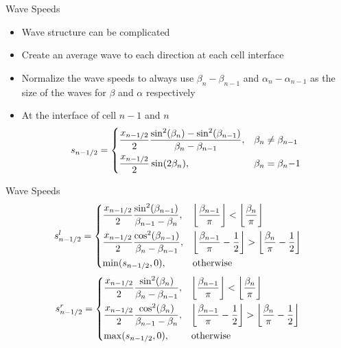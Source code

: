\documentclass[12pt]{beamer}
\begin{document}
\begin{frame}{Wave Speeds}
    \begin{itemize}
        \item Wave structure can be complicated
        \item Create an average wave to each direction at each cell interface
        \item Normalize the wave speeds to always use $\beta_n - \beta_{n-1}$ and
            $\alpha_n - \alpha_{n-1}$ as the size of the waves for $\beta$ and $\alpha$
            respectively
        \item At the interface of cell $n-1$ and $n$
            \[ s_{n-1/2} = \begin{dcases}
                \frac{x_{n-1/2}}{2} \frac{\sin^2(\beta_n) - \sin^2(\beta_{n-1})}{\beta_n
                - \beta_{n-1}}, & \beta_n \ne \beta_{n-1} \\
                \frac{x_{n-1/2}}{2} \sin(2\beta_n), & \beta_n = \beta_n{-1}
            \end{dcases} \]
    \end{itemize}
\end{frame}

\begin{frame}{Wave Speeds}
    \[ s_{n-1/2}^l = \begin{dcases}
        \frac{x_{n-1/2}}{2} \frac{\sin^2(\beta_{n-1})}{\beta_{n-1} - \beta_n}, &
        \left\lfloor \frac{\beta_{n-1}}{\pi} \right\rfloor < \left\lfloor
        \frac{\beta_n}{\pi} \right\rfloor \\
        \frac{x_{n-1/2}}{2} \frac{\cos^2(\beta_{n-1})}{\beta_n - \beta_{n-1}}, &
        \left\lfloor \frac{\beta_{n-1}}{\pi} - \frac{1}{2} \right\rfloor  > \left\lfloor
        \frac{\beta_n}{\pi} - \frac{1}{2} \right\rfloor \\
        \min(s_{n-1/2}, 0), & \textrm{otherwise}
    \end{dcases} \]
    \[ s_{n-1/2}^r = \begin{dcases}
        \frac{x_{n-1/2}}{2} \frac{\sin^2(\beta_n)}{\beta_n - \beta_{n-1}}, &
        \left\lfloor \frac{\beta_{n-1}}{\pi} \right\rfloor < \left\lfloor
        \frac{\beta_n}{\pi} \right\rfloor \\
        \frac{x_{n-1/2}}{2} \frac{\cos^2(\beta_n)}{\beta_{n-1} - \beta_n}, &
        \left\lfloor \frac{\beta_{n-1}}{\pi} - \frac{1}{2} \right\rfloor  > \left\lfloor
        \frac{\beta_n}{\pi} - \frac{1}{2} \right\rfloor \\
        \max(s_{n-1/2}, 0), & \textrm{otherwise}
    \end{dcases} \]
\end{frame}
\end{document}
